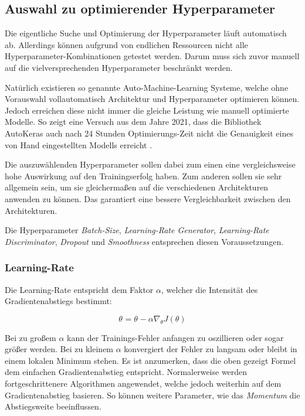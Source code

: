 \subsection{Auswahl zu optimierender Hyperparameter}
Die eigentliche Suche und Optimierung der Hyperparameter läuft automatisch ab.
Allerdings können aufgrund von endlichen Ressourcen nicht alle Hyperparameter-Kombinationen getestet werden.
Darum muss sich zuvor manuell auf die vielversprechenden Hyperparameter beschränkt werden.
\newline

Natürlich existieren so genannte Auto-Machine-Learning Systeme, welche ohne Vorauswahl vollautomatisch Architektur und Hyperparameter optimieren können. 
Jedoch erreichen diese nicht immer die gleiche Leistung wie manuell optimierte Modelle.
So zeigt eine Versuch aus dem Jahre 2021, dass die Bibliothek AutoKeras \cite{auto-keras} auch nach 24 Stunden Optimierungs-Zeit nicht die Genauigkeit eines von Hand eingestellten Modells erreicht \cite[S. 2036]{dl-framework-evaluation}.
\newline

Die auszuwählenden Hyperparameter sollen dabei zum einen eine vergleichsweise hohe Auswirkung auf den Trainingserfolg haben.
Zum anderen sollen sie sehr allgemein sein, um sie gleichermaßen auf die verschiedenen Architekturen anwenden zu können.
Das garantiert eine bessere Vergleichbarkeit zwischen den Architekturen.
\newline

Die Hyperparameter \textit{Batch-Size}, \textit{Learning-Rate Generator}, \textit{Learning-Rate Discriminator}, \textit{Dropout} und \textit{Smoothness} entsprechen diesen Voraussetzungen.

\subsubsection{Learning-Rate}
Die Learning-Rate entspricht dem Faktor \(\alpha\), welcher die Intensität des Gradientenabstiegs bestimmt:  

\[\theta_{}  =  \theta_{}  - \alpha   \nabla_{ \theta }  J( \theta )  \]

Bei zu großem \(\alpha\) kann der Trainings-Fehler anfangen zu oszillieren oder sogar größer werden.
Bei zu kleinem \(\alpha\) konvergiert der Fehler zu langsam oder bleibt in einem lokalen Minimum stehen. 
Es ist anzumerken, dass die oben gezeigt Formel dem einfachen Gradientenabstieg entspricht.
Normalerweise werden fortgeschrittenere Algorithmen angewendet, welche jedoch weiterhin auf dem Gradientenabstieg basieren.
So können weitere Parameter, wie das \textit{Momentum} die Abstiegsweite beeinflussen.
\newline

